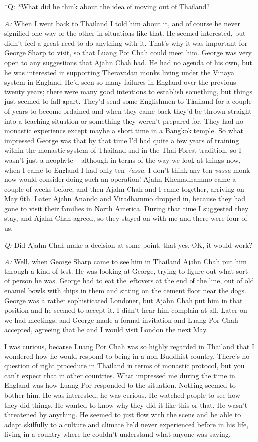 *Q: *What did he think about the idea of moving out of Thailand?

\emph{A:} When I went back to Thailand I told him about it, and of
course he never signified one way or the other in situations like that.
He seemed interested, but didn't feel a great need to do anything with
it. That's why it was important for George Sharp to visit, so that Luang
Por Chah could meet him. George was very open to any suggestions that
Ajahn Chah had. He had no agenda of his own, but he was interested in
supporting Theravadan monks living under the Vinaya system in England.
He'd seen so many failures in England over the previous twenty years;
there were many good intentions to establish something, but things just
seemed to fall apart. They'd send some Englishmen to Thailand for a
couple of years to become ordained and when they came back they'd be
thrown straight into a teaching situation or something they weren't
prepared for. They had no monastic experience except maybe a short time
in a Bangkok temple. So what impressed George was that by that time I'd
had quite a few years of training within the monastic system of Thailand
and in the Thai Forest tradition, so I wasn't just a neophyte --
although in terms of the way we look at things now, when I came to
England I had only ten \emph{Vassa}. I don't think any ten-\emph{vassa}
monk now would consider doing such an operation! Ajahn Khemadhammo came
a couple of weeks before, and then Ajahn Chah and I came together,
arriving on May 6th. Later Ajahn Anando and Viradhammo dropped in,
because they had gone to visit their families in North America. During
that time I suggested they stay, and Ajahn Chah agreed, so they stayed
on with me and there were four of us.

\emph{Q:} Did Ajahn Chah make a decision at some point, that yes, OK, it
would work?

\emph{A:} Well, when George Sharp came to see him in Thailand Ajahn Chah
put him through a kind of test. He was looking at George, trying to
figure out what sort of person he was. George had to eat the leftovers
at the end of the line, out of old enamel bowls with chips in them and
sitting on the cement floor near the dogs. George was a rather
sophisticated Londoner, but Ajahn Chah put him in that position and he
seemed to accept it. I didn't hear him complain at all. Later on we had
meetings, and George made a formal invitation and Luang Por Chah
accepted, agreeing that he and I would visit London the next May.

I was curious, because Luang Por Chah was so highly regarded in Thailand
that I wondered how he would respond to being in a non-Buddhist country.
There's no question of right procedure in Thailand in terms of monastic
protocol, but you can't expect that in other countries. What impressed
me during the time in England was how Luang Por responded to the
situation. Nothing seemed to bother him. He was interested, he was
curious. He watched people to see how they did things. He wanted to know
why they did it like this or that. He wasn't threatened by anything. He
seemed to just flow with the scene and be able to adapt skilfully to a
culture and climate he'd never experienced before in his life, living in
a country where he couldn't understand what anyone was saying.

